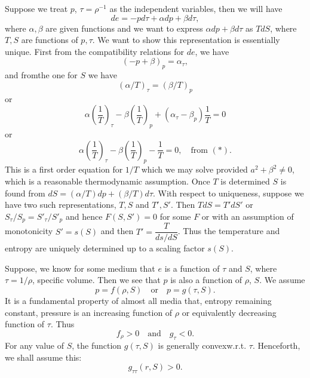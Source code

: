 Suppose we treat $p$, $\tau = \rho^{-1}$ as the independent variables, then we will have
$$
de = - pd\tau + \alpha d p + \beta d \tau,
$$
where $\alpha, \beta$ are given functions and we want to express $\alpha d p + \beta d \tau$ as $T dS$, where $T,S$ are functions of $p,\tau$. We want to show this representation is essentially unique. First from the compatibility relations for $de$, we have
\begin{equation*}
(-p + \beta)_p = \alpha_\tau,
\tag*{$(\ast)$}
\end{equation*}
and from\pageoriginale the one for $S$ we have
$$
(\alpha/ T)_\tau = (\beta/T)_p
$$
or 
$$
\alpha (\frac{1}{T})_\tau -\beta (\frac{1}{T})_p + (\alpha_\tau - \beta_p) \frac{1}{T} = 0 
$$
or 
$$
\alpha (\frac{1}{T})_\tau - \beta (\frac{1}{T})_p - \frac{1}{T} = 0, \quad \text{from $(\ast)$}. 
$$
This is a first order equation for $1/T$ which we may solve provided $a^2 + \beta^2 \neq 0$, which is a reasonable thermodynamic assumption. Once $T$ is determined $S$ is found from $dS = (\alpha / T) dp + (\beta / T) d\tau$. With respect to uniqueness, suppose we have two such representations, $T,S$ and $T', S'$. Then $TdS = T' dS'$ or $S_\tau/S_p = S'_\tau / S'_p$ and hence $F(S,S') = 0$ for some $F$ or with an assumption of monotonicity $S' = s(S)$ and then $T' = \dfrac{T}{ds/dS}$. Thus the temperature and entropy are uniquely determined up to a scaling factor $s(S)$.

Suppose, we know for some medium that $e$ is a function of $\tau$ and $S$, where $\tau = 1/ \rho$, specific volume. Then we see that $p$ is also a function of $\rho$, $S$. We assume 
$$
p = f(\rho, S) \quad \text{or} \quad  p = g(\tau, S). 
$$
It is a fundamental property of almost all media that, entropy remaining constant, pressure is an increasing function of $\rho$ or equivalently decreasing function of $\tau$. Thus
$$
f_\rho > 0 \quad \text{and} \quad g_\tau < 0. 
$$
For any value of $S$, the function $g(\tau, S)$ is generally convex\pageoriginale w.r.t. $\tau$. Henceforth, we shall assume this:
$$
g_{\tau\tau} (r,S) >0.
$$

\medskip
{}

